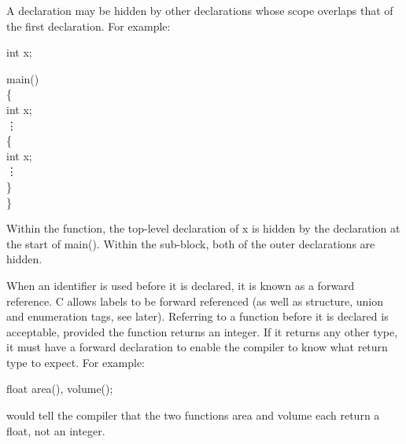      A declaration  may be  hidden by  other declarations whose scope
overlaps that of the first declaration. For example:
\begin{code}
  int x; \addVspace

  main() \\
  \{ \+\\
    int x; \\
    \vdots \\
    \{ \+\\
       int x; \\
       \vdots \-\\
    \} \-\\
  \} 
\end{code}
\noindent
    Within the  function, the  top-level declaration  of {\cd x}  is hidden 
by the declaration at  the start  of {\cd main()}.  Within the
sub-block, both of the outer declarations are hidden.

     When an  identifier is  used before  it is  declared, it is
known as a {\kc forward 
reference\/}. 
C  allows labels  to be  forward
referenced  (as well as structure, union   and enumeration tags, see
later). Referring to a function before it is declared is  acceptable,
provided  the function  returns  an  integer.  If  it returns any 
other type,  it must  have a  {\kc forward declaration\/} to enable
the compiler to know what return type to expect. For example:
\begin{code}
float area(), volume();
\end{code}
\noindent
     would tell  the compiler  that the  two functions  {\cd area}
and {\cd volume} each return a {\cd float}, not an  integer.

